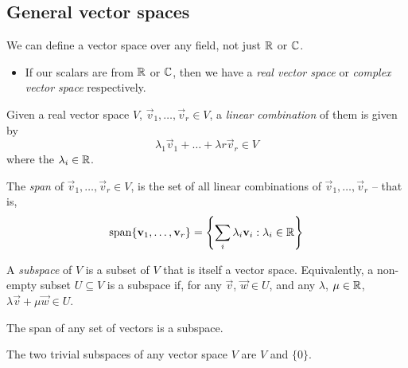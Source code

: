 \documentclass{../../template/note}
\begin{document}
    \subsection{General vector spaces}

    \begin{definition}
        We can define a vector space over any field, not just \(\mathbb R\) or \(\mathbb C\).
        \begin{itemize}
            \item If our scalars are from \(\mathbb R\) or \(\mathbb C\), then we have a \emph{real vector space} or \emph{complex vector space} respectively.
        \end{itemize}
    \end{definition}

    \begin{definition}
        Given a real vector space \(V\), \(\vec v_1, \dots, \vec v_r \in V\), a \emph{linear combination} of them is given by
        \[  
            \lambda_1 \vec v_1 + \dots + \lambda r \vec v_r \in V
        \]
        where the \(\lambda_i \in \mathbb R\).
    \end{definition}
    
    \begin{definition}
        The \emph{span} of \(\vec v_1, \dots, \vec v_r \in V\), is the set of all linear combinations of \(\vec v_1, \dots, \vec v_r\) -- that is,
        \[
            \Span\{\vec v_1, \dots, \vec v_r\} = \left\{\sum_i \lambda_i \vec v_i: \lambda_i \in \RR\right\}
        \]
    \end{definition}
    
    \begin{definition}
        A \emph{subspace} of \(V\) is a subset of \(V\) that is itself a vector space. Equivalently, a non-empty subset \(U \subseteq V\) is a subspace if, for any \(\vec v\), \(\vec w \in U\), and any \(\lambda\), \(\mu \in \mathbb R\), \(\lambda \vec v + \mu \vec w \in U\).
    \end{definition}
    
    \begin{proposition}
        The span of any set of vectors is a subspace.
    \end{proposition}
    
    \begin{remark}
        The two trivial subspaces of any vector space \(V\) are \(V\) and \(\{0\}\).
    \end{remark}
    
\end{document}
